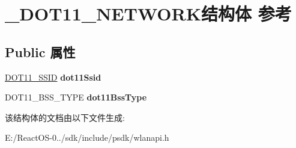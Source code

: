 \hypertarget{struct___d_o_t11___n_e_t_w_o_r_k}{}\section{\+\_\+\+D\+O\+T11\+\_\+\+N\+E\+T\+W\+O\+R\+K结构体 参考}
\label{struct___d_o_t11___n_e_t_w_o_r_k}
\subsection*{Public 属性}
\begin{DoxyCompactItemize}
\item 
\mbox{\label{struct___d_o_t11___n_e_t_w_o_r_k_a0727579fc4f5d43d396189bf9cf4ff2e}} 
\hyperlink{struct___d_o_t11___s_s_i_d}{D\+O\+T11\+\_\+\+S\+S\+ID} {\bfseries dot11\+Ssid}
\item 
\mbox{\label{struct___d_o_t11___n_e_t_w_o_r_k_ad8f53b4aa2dd1b5219d4a38771aac5b4}} 
D\+O\+T11\+\_\+\+B\+S\+S\+\_\+\+T\+Y\+PE {\bfseries dot11\+Bss\+Type}
\end{DoxyCompactItemize}


该结构体的文档由以下文件生成\+:\begin{DoxyCompactItemize}
\item 
E\+:/\+React\+O\+S-\/0../sdk/include/psdk/wlanapi.\+h\end{DoxyCompactItemize}
